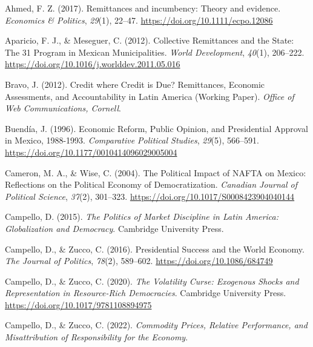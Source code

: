 \documentclass[
]{article}
\newlength{\cslhangindent}
\newlength{\cslentryspacingunit} %
\newenvironment{CSLReferences}[2] %
 {%
  \setlength{\parindent}{0pt}
  \ifodd #1
  \let\oldpar\par
  \def\par{\hangindent=\cslhangindent\oldpar}
  \fi
  \setlength{\parskip}{#2\cslentryspacingunit}
 }%
 {}
\begin{document}
\hypertarget{refs}{}
\begin{CSLReferences}{1}{0}
\leavevmode{}%
Ahmed, F. Z. (2017). Remittances and incumbency: {Theory} and evidence.
\emph{Economics \& Politics}, \emph{29}(1), 22--47.
\url{https://doi.org/10.1111/ecpo.12086}

\leavevmode{}%
Aparicio, F. J., \& Meseguer, C. (2012). Collective {Remittances} and
the {State}: {The} 3{\texttimes}1 {Program} in {Mexican Municipalities}.
\emph{World Development}, \emph{40}(1), 206--222.
\url{https://doi.org/10.1016/j.worlddev.2011.05.016}

\leavevmode{}%
Bravo, J. (2012). Credit where {Credit} is {Due}? {Remittances},
{Economic Assessments}, and {Accountability} in {Latin America}
({Working Paper}). \emph{Office of {Web Communications}, {Cornell}}.

\leavevmode{}%
Buendía, J. (1996). Economic {Reform}, {Public Opinion}, and
{Presidential Approval} in {Mexico}, 1988-1993. \emph{Comparative
Political Studies}, \emph{29}(5), 566--591.
\url{https://doi.org/10.1177/0010414096029005004}

\leavevmode{}%
Cameron, M. A., \& Wise, C. (2004). The {Political Impact} of {NAFTA} on
{Mexico}: {Reflections} on the {Political Economy} of {Democratization}.
\emph{Canadian Journal of Political Science}, \emph{37}(2), 301--323.
\url{https://doi.org/10.1017/S0008423904040144}

\leavevmode{}%
Campello, D. (2015). \emph{The {Politics} of {Market Discipline} in
{Latin America}: {Globalization} and {Democracy}}. {Cambridge University
Press}.

\leavevmode{}%
Campello, D., \& Zucco, C. (2016). Presidential {Success} and the {World
Economy}. \emph{The Journal of Politics}, \emph{78}(2), 589--602.
\url{https://doi.org/10.1086/684749}

\leavevmode{}%
Campello, D., \& Zucco, C. (2020). \emph{The {Volatility Curse}:
{Exogenous Shocks} and {Representation} in {Resource-Rich Democracies}}.
{Cambridge University Press}.
\url{https://doi.org/10.1017/9781108894975}

\leavevmode{}%
Campello, D., \& Zucco, C. (2022). \emph{Commodity {Prices}, {Relative
Performance}, and {Misattribution} of {Responsibility} for the
{Economy}}.


\end{CSLReferences}
\end{document}
